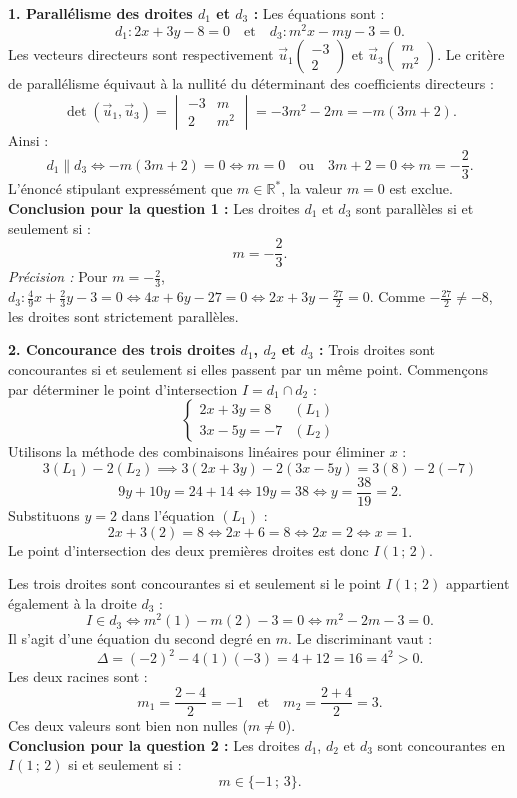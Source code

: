 \documentclass[11pt,a4paper]{article}
\newcommand{\R}{\mathbb{R}}
\renewcommand{\det}{\operatorname{det}}
\begin{document}
\begin{correctionbox}
\textbf{1. Parallélisme des droites $d_1$ et $d_3$ :}
Les équations sont :
\[
d_1 : 2x + 3y - 8 = 0 \quad \text{et} \quad d_3 : m^2 x - m y - 3 = 0.
\]
Les vecteurs directeurs sont respectivement $\vec{u}_1\begin{pmatrix} -3 \\ 2 \end{pmatrix}$ et $\vec{u}_3\begin{pmatrix} m \\ m^2 \end{pmatrix}$.
Le critère de parallélisme équivaut à la nullité du déterminant des coefficients directeurs :
\[
\det(\vec{u}_1, \vec{u}_3) = \begin{vmatrix} -3 & m \\ 2 & m^2 \end{vmatrix} = -3m^2 - 2m = -m(3m + 2).
\]
Ainsi :
\[
d_1 \parallel d_3 \iff -m(3m + 2) = 0 \iff m = 0 \quad \text{ou} \quad 3m + 2 = 0 \iff m = -\frac{2}{3}.
\]
L'énoncé stipulant expressément que $m \in \R^*$, la valeur $m = 0$ est exclue.\\
\textbf{Conclusion pour la question 1 :} Les droites $d_1$ et $d_3$ sont parallèles si et seulement si :
\[
m = -\frac{2}{3}.
\]
\textit{Précision :} Pour $m = -\frac{2}{3}$, $d_3 : \frac{4}{9}x + \frac{2}{3}y - 3 = 0 \iff 4x + 6y - 27 = 0 \iff 2x + 3y - \frac{27}{2} = 0$. Comme $-\frac{27}{2} \neq -8$, les droites sont strictement parallèles.

\textbf{2. Concourance des trois droites $d_1$, $d_2$ et $d_3$ :}
Trois droites sont concourantes si et seulement si elles passent par un même point. Commençons par déterminer le point d'intersection $I = d_1 \cap d_2$ :
\[
\begin{cases}
2x + 3y = 8 & (L_1) \\
3x - 5y = -7 & (L_2)
\end{cases}
\]
Utilisons la méthode des combinaisons linéaires pour éliminer $x$ :
\[
3(L_1) - 2(L_2) \implies 3(2x + 3y) - 2(3x - 5y) = 3(8) - 2(-7)
\]
\[
9y + 10y = 24 + 14 \iff 19y = 38 \iff y = \frac{38}{19} = 2.
\]
Substituons $y = 2$ dans l'équation $(L_1)$ :
\[
2x + 3(2) = 8 \iff 2x + 6 = 8 \iff 2x = 2 \iff x = 1.
\]
Le point d'intersection des deux premières droites est donc $I(1\,;\,2)$.

Les trois droites sont concourantes si et seulement si le point $I(1\,;\,2)$ appartient également à la droite $d_3$ :
\[
I \in d_3 \iff m^2(1) - m(2) - 3 = 0 \iff m^2 - 2m - 3 = 0.
\]
Il s'agit d'une équation du second degré en $m$. Le discriminant vaut :
\[
\Delta = (-2)^2 - 4(1)(-3) = 4 + 12 = 16 = 4^2 > 0.
\]
Les deux racines sont :
\[
m_1 = \frac{2 - 4}{2} = -1 \quad \text{et} \quad m_2 = \frac{2 + 4}{2} = 3.
\]
Ces deux valeurs sont bien non nulles ($m \neq 0$).\\
\textbf{Conclusion pour la question 2 :} Les droites $d_1$, $d_2$ et $d_3$ sont concourantes en $I(1\,;\,2)$ si et seulement si :
\[
m \in \{-1 \,;\, 3\}.
\]
\end{correctionbox}
\end{document}
